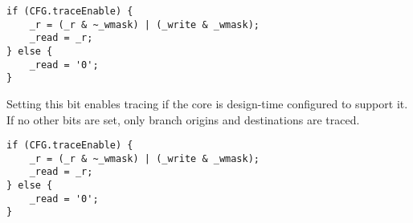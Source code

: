 \declaration{}
\implementation{}
\begin{lstlisting}
if (CFG.traceEnable) {
    _r = (_r & ~_wmask) | (_write & _wmask);
    _read = _r;
} else {
    _read = '0';
}
\end{lstlisting}

Setting this bit enables tracing if the core is design-time configured to 
support it. If no other bits are set, only branch origins and destinations are 
traced.

\declaration{}
\implementation{}
\begin{lstlisting}
if (CFG.traceEnable) {
    _r = (_r & ~_wmask) | (_write & _wmask);
    _read = _r;
} else {
    _read = '0';
}
\end{lstlisting}

